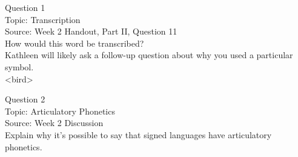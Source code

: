 \documentclass[12pt]{article}
\begin{document}
\begin{center}
\textbf{{\color{violet}{\HUGE 20210604 Friday\\}}}

\textbf{{\color{violet}{\HUGE ALL EXAMS\\}}}

\end{center}
\newpage

\begin{center}
\textbf{{\color{blue}{\HUGE START OF EXAM\\}}}

\textbf{{\color{blue}{\HUGE Student ID: 16464\\}}}

\textbf{{\color{blue}{\HUGE 3:00\\}}}

\end{center}
\newpage

{\large Question 1}\\

Topic: Transcription\\
Source: Week 2 Handout, Part II, Question 11\\

How would this word be transcribed?\\ Kathleen will likely ask a follow-up question about why you used a particular symbol.\\

<bird>


\newpage

{\large Question 2}\\

Topic: Articulatory Phonetics\\
Source: Week 2 Discussion\\

Explain why it's possible to say that signed languages have articulatory phonetics.\\


\newpage

\begin{center}
\textbf{{\color{red}{\HUGE END OF EXAM}}}\\

\end{center}
\newpage
\end{document}
